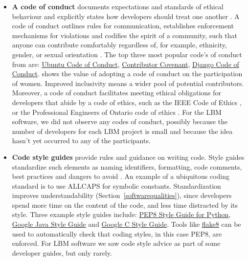 \documentclass[final, 3p, times, authoryear]{elsarticle}
\newcommand{\CC}{C\nolinebreak\hspace{-.05em}\raisebox{.4ex}{\small\bf
+}\nolinebreak\hspace{-.10em}\raisebox{.4ex}{\small\bf +}}
\begin{document}
\begin{itemize}
\item \textbf{A code of conduct} documents expectations and standards of ethical
behaviour and explicitly states how developers should treat one another
\citep{TouraniEtAl2017}. A code of conduct outlines rules for communication,
establishes enforcement mechanisms for violations and codifies the spirit of a
community, such that anyone can contribute comfortably regardless of, for
example, ethnicity, gender, or sexual orientation \citep{TouraniEtAl2017}. The
top three most popular code's of conduct from \citet{TouraniEtAl2017} are:
\href{https://ubuntu.com/community/code-of-conduct} {Ubuntu Code of Conduct},
\href{https://www.contributor-covenant.org/version/2/1/code_of_conduct/}
{Contributor Covenant}, \href{https://www.djangoproject.com/conduct/} {Django
Code of Conduct}. \citet{SinghEtAl2021} shows the value of adopting a code of
conduct on the participation of women. Improved inclusivity means a wider pool
of potential contributors. Moreover, a code of conduct facilitates meeting
ethical obligations for developers that abide by a code of ethics, such as the
IEEE Code of Ethics \citep{IEEE1999}, or the Professional Engineers of Ontario
code of ethics \citep[p.\ 23--24]{PEO2021}. For the LBM software, we did not
observe any codes of conduct, possibly because the number of developers for each
LBM project is small and because the idea hasn't yet occurred to any of the
participants.

\item \textbf{Code style guides} provide rules and guidance on writing code.
Style guides standardize such elements as naming identifiers, formatting, code
comments, best practices and dangers to avoid \citep{Carty2020}. An example of a
ubiquitous coding standard is to use ALLCAPS for symbolic constants.
Standardization improves understandability (Section~\ref{softwarequalities}),
since developers spend more time on the content of the code, and less time
distracted by its style.  Three example style guides include:
\href{http://cnl.sogang.ac.kr/cnlab/lectures/programming/python/PEP8_Style_Guide.pdf}
{PEP8 Style Guide for Python},
\href{https://google.github.io/styleguide/javaguide.html} {Google Java Style
Guide} and \href{https://google.github.io/styleguide/cppguide.html} {Google \CC
Style Guide}.  Tools like \href{https://pypi.org/project/flake8/}{flake8} can be
used to automatically check that coding styles, in this case PEP8, are enforced.
For LBM software we saw code style advice as part of some developer guides, but
only rarely.


\end{itemize}
\end{document}
